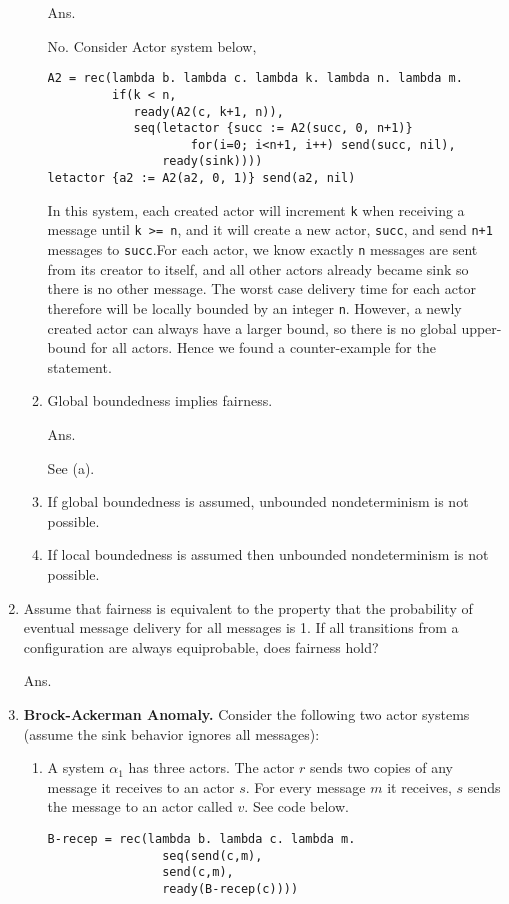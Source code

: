\documentclass{article}
\begin{document}
\begin{enumerate}
\begin{enumerate}
Ans.

No. Consider Actor system below,
\begin{verbatim}
A2 = rec(lambda b. lambda c. lambda k. lambda n. lambda m.
         if(k < n,
            ready(A2(c, k+1, n)),
            seq(letactor {succ := A2(succ, 0, n+1)}
                    for(i=0; i<n+1, i++) send(succ, nil),
                ready(sink))))
letactor {a2 := A2(a2, 0, 1)} send(a2, nil)
\end{verbatim}
In this system, each created actor will increment \texttt{k} when receiving a
message until \texttt{k >= n}, and it will create a new actor, \texttt{succ},
and send \texttt{n+1} messages to \texttt{succ}.For each actor, we know
exactly \texttt{n} messages are sent from its creator to itself, and all
other actors already became sink so there is no other message. The worst case
delivery time for each actor therefore will be locally bounded by an integer
\texttt{n}. However, a newly created actor can always have a larger bound, so
there is no global upper-bound for all actors. Hence we found a
counter-example for the statement.

\item Global boundedness implies fairness.

Ans.

See (a).

\item If global boundedness is assumed, unbounded nondeterminism is not
possible.

\item If local boundedness is assumed then unbounded nondeterminism is not
possible.

\end{enumerate}

\item Assume that fairness is equivalent to the property that the probability
of eventual message delivery for all messages is 1. If all transitions from a
configuration are always equiprobable, does fairness hold?

Ans.

\item \textbf{Brock-Ackerman Anomaly.} Consider the following two actor
systems (assume the sink behavior ignores all messages):

\begin{enumerate}
\item A system $\alpha_1$ has three actors. The actor $r$ sends two copies of
any message it receives to an actor $s$. For every message $m$ it receives,
$s$ sends the message to an actor called $v$. See code below.
\begin{verbatim}
B-recep = rec(lambda b. lambda c. lambda m.
                seq(send(c,m),
                send(c,m),
                ready(B-recep(c))))


\end{verbatim}
\end{enumerate}
\end{enumerate}
\end{document}
